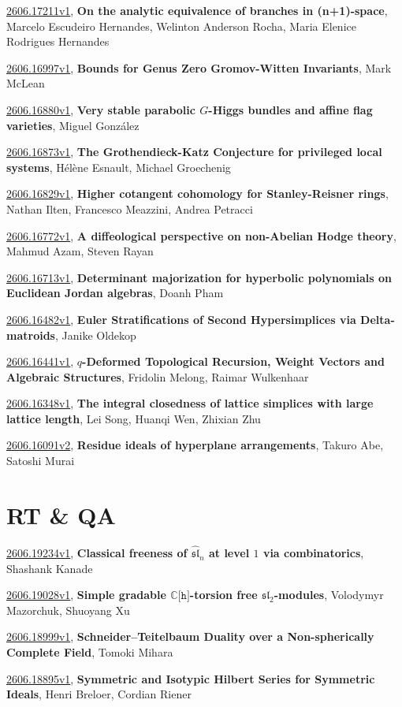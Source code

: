 \documentclass[9pt, a4paper]{article}
\theoremstyle{plain}
\theoremstyle{definition}
\theoremstyle{remark}
\newcommand{\arxiv}[3]{\href{https://arxiv.org/abs/#1}{#1}, \textbf{\textcolor{arxivblue}{#2}}, #3}
\begin{document}
\arxiv{2606.17211v1}{On the analytic equivalence of branches in (n+1)-space}{Marcelo Escudeiro Hernandes, Welinton Anderson Rocha, Maria Elenice Rodrigues Hernandes}

\arxiv{2606.16997v1}{Bounds for Genus Zero Gromov-Witten Invariants}{Mark McLean}

\arxiv{2606.16880v1}{Very stable parabolic $G$-Higgs bundles and affine flag varieties}{Miguel González}

\arxiv{2606.16873v1}{The Grothendieck-Katz Conjecture for privileged local systems}{Hélène Esnault, Michael Groechenig}

\arxiv{2606.16829v1}{Higher cotangent cohomology for Stanley-Reisner rings}{Nathan Ilten, Francesco Meazzini, Andrea Petracci}

\arxiv{2606.16772v1}{A diffeological perspective on non-Abelian Hodge theory}{Mahmud Azam, Steven Rayan}

\arxiv{2606.16713v1}{Determinant majorization for hyperbolic polynomials on Euclidean Jordan algebras}{Doanh Pham}

\arxiv{2606.16482v1}{Euler Stratifications of Second Hypersimplices via Delta-matroids}{Janike Oldekop}

\arxiv{2606.16441v1}{$q$-Deformed Topological Recursion, Weight Vectors and Algebraic Structures}{Fridolin Melong, Raimar Wulkenhaar}

\arxiv{2606.16348v1}{The integral closedness of lattice simplices with large lattice length}{Lei Song, Huanqi Wen, Zhixian Zhu}

\arxiv{2606.16091v2}{Residue ideals of hyperplane arrangements}{Takuro Abe, Satoshi Murai}


\section{RT \& QA}
\arxiv{2606.19234v1}{Classical freeness of $\widehat{\mathfrak{sl}}_n$ at level $1$ via combinatorics}{Shashank Kanade}

\arxiv{2606.19028v1}{Simple gradable $\mathbb{C}\lbrack\mathtt{h}\rbrack$-torsion free $\mathfrak{sl}_2$-modules}{Volodymyr Mazorchuk, Shuoyang Xu}

\arxiv{2606.18999v1}{Schneider--Teitelbaum Duality over a Non-spherically Complete Field}{Tomoki Mihara}

\arxiv{2606.18895v1}{Symmetric and Isotypic Hilbert Series for Symmetric Ideals}{Henri Breloer, Cordian Riener}
\end{document}
